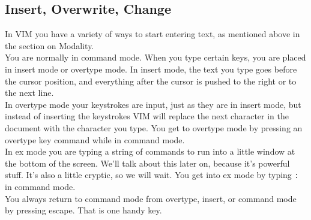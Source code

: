 \documentclass[a4paper, 12pt]{article}
\begin{document}
\subsection{Insert, Overwrite, Change}
\label{"Insert, Overwrite, Change"}
In VIM you have a variety of ways to start entering text, as mentioned above in the section on Modality.\\
You are normally in command mode. When you type certain keys, you are placed in insert mode or overtype mode. In insert mode, the text you type goes before the cursor position, and everything after the cursor is pushed to the right or to the next line.\\
In overtype mode your keystrokes are input, just as they are in insert mode, but instead of inserting the keystrokes VIM will replace the next character in the document with the character you type. You get to overtype mode by pressing an overtype key command while in command mode.\\
In ex mode you are typing a string of commands to run into a little window at the bottom of the screen. We'll talk about this later on, because it's powerful stuff. It's also a little cryptic, so we will wait. You get into ex mode by typing \texttt{:} in command mode.\\
You always return to command mode from overtype, insert, or command mode by pressing escape. That is one handy key.
\end{document}
